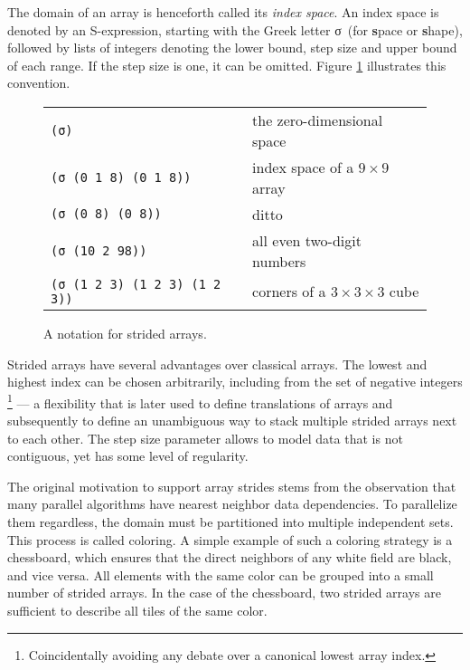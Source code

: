 The domain of an array is henceforth called its \emph{index space}.  An
index space is denoted by an S-expression, starting with the Greek letter σ
\,(for \textbf{s}pace or \textbf{s}hape), followed by lists of integers
denoting the lower bound, step size and upper bound of each range. If the
step size is one, it can be omitted. Figure \ref{fig:sigma-examples}
illustrates this convention.

\begin{figure}[h]
  \begin{tabular}{ll}
    \texttt{(σ)}                         & \hspace{-1em} the zero-dimensional space \\
    \texttt{(σ (0 1 8) (0 1 8))}         & \hspace{-1em} index space of a $9 \times 9$ array \\
    \texttt{(σ (0 8) (0 8))}             & \hspace{-1em} ditto \\
    \texttt{(σ (10 2 98))}               & \hspace{-1em} all even two-digit numbers \\
    \texttt{(σ (1 2 3) (1 2 3) (1 2 3))} & \hspace{-1em} corners of a $3 \times 3 \times 3$ cube \\
  \end{tabular}
  \caption{A notation for strided arrays.}
  \label{fig:sigma-examples}
\end{figure}

Strided arrays have several advantages over classical arrays. The lowest
and highest index can be chosen arbitrarily, including from the set of
negative integers \footnote{Coincidentally avoiding any debate over a
  canonical lowest array index.} --- a flexibility that is later used to
define translations of arrays and subsequently to define an unambiguous way
to stack multiple strided arrays next to each other.  The step size
parameter allows to model data that is not contiguous, yet has some level
of regularity.

The original motivation to support array strides stems from the observation
that many parallel algorithms have nearest neighbor data dependencies. To
parallelize them regardless, the domain must be partitioned into multiple
independent sets. This process is called coloring. A simple example of such
a coloring strategy is a chessboard, which ensures that the direct
neighbors of any white field are black, and vice versa. All elements with
the same color can be grouped into a small number of strided arrays. In the
case of the chessboard, two strided arrays are sufficient to describe all
tiles of the same color.

